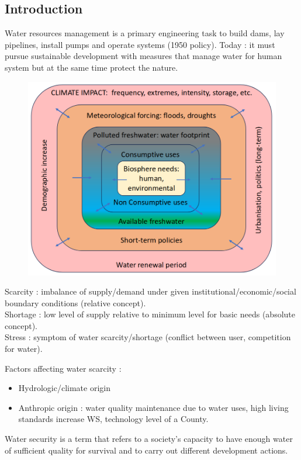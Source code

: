 \documentclass[../main.tex]{subfiles}
\begin{document}
\localtableofcontents

\subsection{Introduction}

Water resources management is a primary engineering task to build dams, lay pipelines, install pumps and operate systems (1950 policy). Today : it must pursue sustainable development with measures that manage water for human system but at the same time protect the nature.\\

\begin{figure}[hbt!]
    \centering
    \includegraphics[width=0.5\linewidth]{IMAGES/Hydraulic/Screenshot from 2025-02-17 14-22-06.png}
\end{figure}

\begin{theorem}
    Scarcity : imbalance of supply/demand under given institutional/economic/social boundary conditions (relative concept).\\
    Shortage : low level of supply relative to minimum level for basic needs (absolute concept).\\
    Stress : symptom of water scarcity/shortage (conflict between user, competition for water).\\
\end{theorem}

Factors affecting water scarcity : \begin{itemize}
    \item Hydrologic/climate origin
    \item Anthropic origin : water quality maintenance due to water uses, high living standards increase WS, technology level of a County.
\end{itemize}

Water security is a term that refers to a society's capacity to have enough water of sufficient quality for survival and to carry out different development actions.\\
\end{document}
